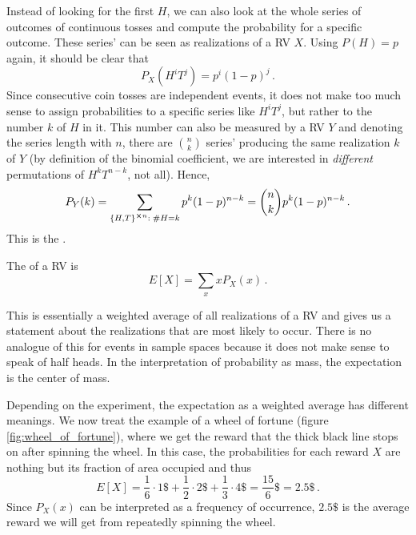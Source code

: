 \begin{ex}
Instead of looking for the first $H$, we can also look at the whole series of outcomes of continuous tosses and compute the probability for a specific outcome. These series' can be seen as realizations of a RV $X$. Using $P(H) = p$ again, it should be clear that
\begin{equation*}
P_X(H^i T^j) = p^i (1 - p)^j \, .
\end{equation*}
Since consecutive coin tosses are independent events, it does not make too much sense to assign probabilities to a specific series like $H^i T^j$, but rather to the number $k$ of $H$ in it. This number can also be measured by a RV $Y$ and denoting the series length with $n$, there are $\binom{n}{k}$ series' producing the same realization $k$ of $Y$ (by definition of the binomial coefficient, we are interested in \emph{different} permutations of $H^k T^{n - k}$, not all). Hence,
\begin{equation*}
P_Y(k) = \sum_{\qty{H, T}^{\cross n}: \; \# H = k} p^k (1 - p)^{n - k} = \binom{n}{k} p^k (1 - p)^{n - k} \, .
\end{equation*}
This is the .
\end{ex}


\begin{defi}[Expectation]
The  of a RV is
\begin{equation}
E[X] = \sum_x x P_X(x) \, .
\end{equation}
\end{defi}
This is essentially a weighted average of all realizations of a RV and gives us a statement about the realizations that are most likely to occur. There is no analogue of this for events in sample spaces because it does not make sense to speak of half heads. In the interpretation of probability as mass, the expectation is the center of mass.


\begin{ex}
Depending on the experiment, the expectation as a weighted average has different meanings. We now treat the example of a wheel of fortune (figure \ref{fig:wheel_of_fortune}), where we get the reward that the thick black line stops on after spinning the wheel. In this case, the probabilities for each reward $X$ are nothing but its fraction of area occupied and thus
\begin{equation*}
E[X] = \frac{1}{6} \cdot 1\$ + \frac{1}{2} \cdot 2\$ + \frac{1}{3} \cdot 4\$ = \frac{15}{6} \$ = 2.5\$ \, .
\end{equation*}
Since $P_X(x)$ can be interpreted as a frequency of occurrence, $2.5\$$ is the average reward we will get from repeatedly spinning the wheel.
\end{ex}




